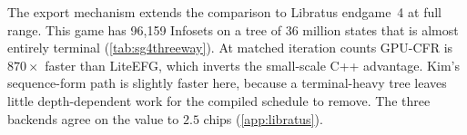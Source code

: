 The export mechanism extends the comparison to Libratus endgame~4
\cite{brown2018superhuman,steinberger2019pokerrl} at full range. This game has
96{,}159 Infosets on a tree of 36 million states that is almost entirely terminal
(\cref{tab:sg4threeway}). At matched iteration counts GPU-CFR is $870\times$ faster
than LiteEFG, which inverts the small-scale C++ advantage. Kim's sequence-form path
is slightly faster here, because a terminal-heavy tree leaves little depth-dependent
work for the compiled schedule to remove. The three backends agree on the value to $2.5$ chips
(\cref{app:libratus}).

